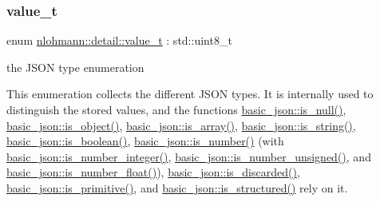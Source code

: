 \subsubsection{\texorpdfstring{value\_t}{value\_t}}
{\footnotesize\ttfamily enum \mbox{\hyperlink{namespacenlohmann_1_1detail_a1ed8fc6239da25abcaf681d30ace4985}{nlohmann\+::detail\+::value\+\_\+t}} \+: std\+::uint8\+\_\+t\hspace{0.3cm}{\ttfamily [strong]}}



the J\+S\+ON type enumeration 

This enumeration collects the different J\+S\+ON types. It is internally used to distinguish the stored values, and the functions \mbox{\hyperlink{classnlohmann_1_1basic__json_a8faa039ca82427ed29c486ffd00600c3}{basic\+\_\+json\+::is\+\_\+null()}}, \mbox{\hyperlink{classnlohmann_1_1basic__json_af8f511af124e82e4579f444b4175787c}{basic\+\_\+json\+::is\+\_\+object()}}, \mbox{\hyperlink{classnlohmann_1_1basic__json_aef9ce5dd2381caee1f8ddcdb5bdd9c65}{basic\+\_\+json\+::is\+\_\+array()}}, \mbox{\hyperlink{classnlohmann_1_1basic__json_a69b596a4a6683b362095c9a139637396}{basic\+\_\+json\+::is\+\_\+string()}}, \mbox{\hyperlink{classnlohmann_1_1basic__json_a943e8cb182d0f2365c76d64b42eaa6fd}{basic\+\_\+json\+::is\+\_\+boolean()}}, \mbox{\hyperlink{classnlohmann_1_1basic__json_a2b9852390abb4b1ef5fac6984e2fc0f3}{basic\+\_\+json\+::is\+\_\+number()}} (with \mbox{\hyperlink{classnlohmann_1_1basic__json_abac8af76067f1e8fdca9052882c74428}{basic\+\_\+json\+::is\+\_\+number\+\_\+integer()}}, \mbox{\hyperlink{classnlohmann_1_1basic__json_abc7378cba0613a78b9aad1c8e7044bb0}{basic\+\_\+json\+::is\+\_\+number\+\_\+unsigned()}}, and \mbox{\hyperlink{classnlohmann_1_1basic__json_a33b4bf898b857c962e798fc7f6e86e70}{basic\+\_\+json\+::is\+\_\+number\+\_\+float()}}), \mbox{\hyperlink{classnlohmann_1_1basic__json_aabe623bc8304c2ba92d96d91f390fab4}{basic\+\_\+json\+::is\+\_\+discarded()}}, \mbox{\hyperlink{classnlohmann_1_1basic__json_a6362b88718eb5c6d4fed6a61eed44b95}{basic\+\_\+json\+::is\+\_\+primitive()}}, and \mbox{\hyperlink{classnlohmann_1_1basic__json_a9f68a0af820c3ced7f9d17851ce4c22d}{basic\+\_\+json\+::is\+\_\+structured()}} rely on it.

